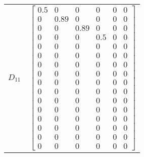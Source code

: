 \begin{tabular}{cl}
 $D_{11}$ & $\left[\begin{matrix}0.5 & 0 & 0 & 0 & 0 & 0\\0 & 0.89 & 0 & 0 & 0 & 0\\0 & 0 & 0.89 & 0 & 0 & 0\\0 & 0 & 0 & 0.5 & 0 & 0\\0 & 0 & 0 & 0 & 0 & 0\\0 & 0 & 0 & 0 & 0 & 0\\0 & 0 & 0 & 0 & 0 & 0\\0 & 0 & 0 & 0 & 0 & 0\\0 & 0 & 0 & 0 & 0 & 0\\0 & 0 & 0 & 0 & 0 & 0\\0 & 0 & 0 & 0 & 0 & 0\\0 & 0 & 0 & 0 & 0 & 0\\0 & 0 & 0 & 0 & 0 & 0\\0 & 0 & 0 & 0 & 0 & 0\\0 & 0 & 0 & 0 & 0 & 0\\0 & 0 & 0 & 0 & 0 & 0\end{matrix}\right]$                                                                                                                                                                                                                                                                                                                                                                                                                                                                                                                                                                                                                                                                                                                                                                                                                                                                                                                                                                                                                                                                                                                                                                                                                                                                                                                                                                                                                                                                                                                                                                                                                                                                                                                                                                                                                                                \\

\end{tabular}
